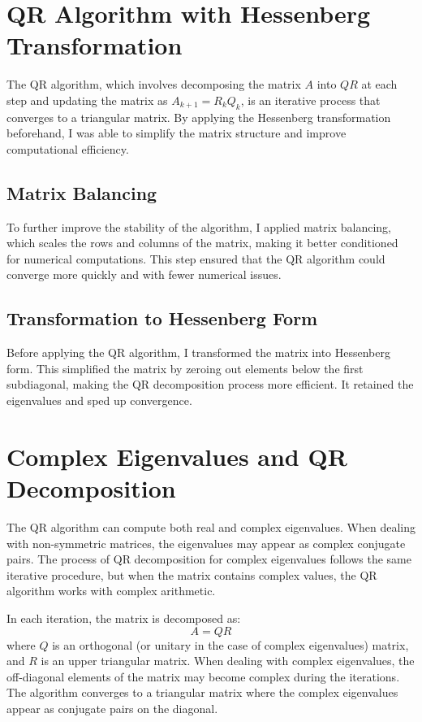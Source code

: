 \documentclass{article}
\begin{document}
\section{QR Algorithm with Hessenberg Transformation}
The QR algorithm, which involves decomposing the matrix $ A $ into $ QR $ at each step and updating the matrix as $ A_{k+1} = R_k Q_k $, is an iterative process that converges to a triangular matrix. By applying the Hessenberg transformation beforehand, I was able to simplify the matrix structure and improve computational efficiency.

\subsection{Matrix Balancing}
To further improve the stability of the algorithm, I applied matrix balancing, which scales the rows and columns of the matrix, making it better conditioned for numerical computations. This step ensured that the QR algorithm could converge more quickly and with fewer numerical issues.

\subsection{Transformation to Hessenberg Form}
Before applying the QR algorithm, I transformed the matrix into Hessenberg form. This simplified the matrix by zeroing out elements below the first subdiagonal, making the QR decomposition process more efficient. It retained the eigenvalues and sped up convergence.

\section{Complex Eigenvalues and QR Decomposition}
The QR algorithm can compute both real and complex eigenvalues. When dealing with non-symmetric matrices, the eigenvalues may appear as complex conjugate pairs. The process of QR decomposition for complex eigenvalues follows the same iterative procedure, but when the matrix contains complex values, the QR algorithm works with complex arithmetic.

In each iteration, the matrix is decomposed as:
$$
A = QR
$$
where $ Q $ is an orthogonal (or unitary in the case of complex eigenvalues) matrix, and $ R $ is an upper triangular matrix. When dealing with complex eigenvalues, the off-diagonal elements of the matrix may become complex during the iterations. The algorithm converges to a triangular matrix where the complex eigenvalues appear as conjugate pairs on the diagonal.
\end{document}
